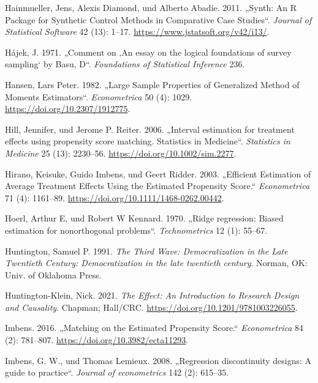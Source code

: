 \documentclass[
  a4paper,
  DIV=11,
  oneside]{scrreprt}
\newlength{\cslhangindent}
\newenvironment{CSLReferences}[2] %
 {\begin{list}{}{%
  \setlength{\itemindent}{0pt}
  \setlength{\leftmargin}{0pt}
  \setlength{\parsep}{0pt}
  \ifodd #1
   \setlength{\leftmargin}{\cslhangindent}
   \setlength{\itemindent}{-1\cslhangindent}
  \fi
  \setlength{\itemsep}{#2\baselineskip}}}
 {\end{list}}
\begin{document}
\begin{CSLReferences}{1}{0}
Hainmueller, Jens, Alexis Diamond, und Alberto Abadie. 2011. {„Synth: An
R Package for Synthetic Control Methods in Comparative Case Studies``}.
\emph{Journal of Statistical Software} 42 (13): 1--17.
\url{https://www.jstatsoft.org/v42/i13/}.

Hájek, J. 1971. {„Comment on {‚An essay on the logical foundations of
survey sampling`} by Basu, D``}. \emph{Foundations of Statistical
Inference} 236.

Hansen, Lars Peter. 1982. {„Large Sample Properties of Generalized
Method of Moments Estimators``}. \emph{Econometrica} 50 (4): 1029.
\url{https://doi.org/10.2307/1912775}.

Hill, Jennifer, und Jerome P. Reiter. 2006. {„Interval estimation for
treatment effects using propensity score matching. Statistics in
Medicine``}. \emph{Statistics in Medicine} 25 (13): 2230--56.
\url{https://doi.org/10.1002/sim.2277}.

Hirano, Keisuke, Guido Imbens, und Geert Ridder. 2003. {„Efficient
Estimation of Average Treatment Effects Using the Estimated Propensity
Score.``} \emph{Econometrica} 71 (4): 1161--89.
\url{https://doi.org/10.1111/1468-0262.00442}.

Hoerl, Arthur E, und Robert W Kennard. 1970. {„{Ridge regression: Biased
estimation for nonorthogonal problems}``}. \emph{Technometrics} 12 (1):
55--67.

Huntington, Samuel P. 1991. \emph{The Third Wave: Democratization in the
Late Twentieth Century: Democratization in the late twentieth century}.
Norman, OK: Univ. of Oklahoma Press.

Huntington-Klein, Nick. 2021. \emph{The Effect: An Introduction to
Research Design and Causality}. Chapman; Hall/CRC.
\url{https://doi.org/10.1201/9781003226055}.

Imbens. 2016. {„Matching on the Estimated Propensity Score.``}
\emph{Econometrica} 84 (2): 781--807.
\url{https://doi.org/10.3982/ecta11293}.

Imbens, G. W., und Thomas Lemieux. 2008. {„Regression discontinuity
designs: A guide to practice``}. \emph{Journal of econometrics} 142 (2):
615--35.


\end{CSLReferences}
\end{document}
